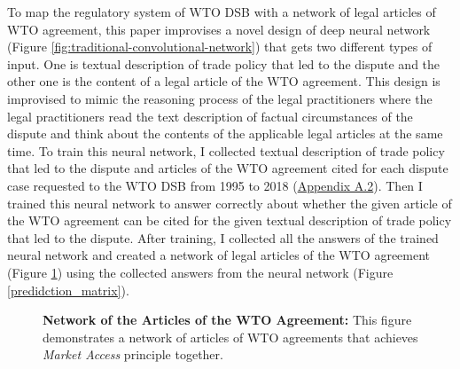 To map the regulatory system of WTO DSB with 
a network of legal articles of WTO agreement,
this paper improvises a novel design of deep neural network (Figure \ref{fig:traditional-convolutional-network}) that
gets two different types of input.
One is textual description of trade policy that led to the dispute and
the other one is the content of a legal article of the WTO agreement.
This design is improvised to mimic
the reasoning process of the legal practitioners
where the legal practitioners read
the text description of
factual circumstances of the dispute and think about the contents of
the applicable legal articles at the same time.
To train this neural network, I collected textual description of trade policy 
that led to the dispute and articles of the WTO agreement cited for each dispute
case requested to the WTO DSB 
from 1995 to 2018 (\hyperref[sub:cited-articles-table]{Appendix A.2}).
Then I trained this neural network to answer correctly 
about whether the given article of the WTO agreement
can be cited for the given textual description of 
trade policy that led to the dispute.
After training, I collected all the answers of the trained neural network 
and created a network of legal articles of the WTO agreement (Figure \ref{fig:market-aceess_directed}) using 
the collected answers from the neural network (Figure \ref{predidction_matrix}).


\begin{figure}
    \centering{
      
    }
    \caption{{\bf Network of the Articles of the WTO Agreement:} 
    This figure demonstrates a network of articles of WTO agreements
    that achieves \textit{Market Access} principle together.
    }
    \label{fig:market-aceess_directed}
  \end{figure}
  
% 

% 



